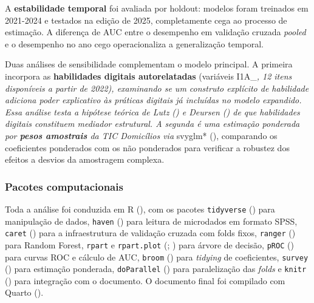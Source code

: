 \documentclass[
  man,
  floatsintext,
  longtable,
  a4paper,
  nolmodern,
  notxfonts,
  notimes,
  colorlinks=true,linkcolor=blue,citecolor=blue,urlcolor=blue]{apa7}
\begin{document}
A \textbf{estabilidade temporal} foi avaliada por holdout: modelos foram
treinados em 2021-2024 e testados na edição de 2025, completamente cega
ao processo de estimação. A diferença de AUC entre o desempenho em
validação cruzada \emph{pooled} e o desempenho no ano cego
operacionaliza a generalização temporal.

Duas análises de sensibilidade complementam o modelo principal. A
primeira incorpora as \textbf{habilidades digitais autorelatadas}
(variáveis I1A\_\emph{, 12 itens disponíveis a partir de 2022),
examinando se um construto explícito de habilidade adiciona poder
explicativo às práticas digitais já incluídas no modelo expandido. Essa
análise testa a hipótese teórica de Lutz
() e Deursen
() de que habilidades
digitais constituem mediador estrutural. A segunda é uma estimação
ponderada por \textbf{pesos amostrais} da TIC Domicílios via }svyglm*
(), comparando
os coeficientes ponderados com os não ponderados para verificar a
robustez dos efeitos a desvios da amostragem complexa.

\subsubsection{Pacotes computacionais}\label{pacotes-computacionais}

Toda a análise foi conduzida em R (), com os pacotes \texttt{tidyverse}
() para manipulação de dados,
\texttt{haven} ()
para leitura de microdados em formato SPSS, \texttt{caret}
() para a infraestrutura de validação
cruzada com folds fixos, \texttt{ranger}
() para Random Forest,
\texttt{rpart} e \texttt{rpart.plot}
(;
) para árvore de
decisão, \texttt{pROC} () para
curvas ROC e cálculo de AUC, \texttt{broom}
() para
\emph{tidying} de coeficientes, \texttt{survey}
() para
estimação ponderada, \texttt{doParallel}
() para
paralelização das \emph{folds} e \texttt{knitr}
() para integração com o documento. O
documento final foi compilado com Quarto ().
\end{document}
